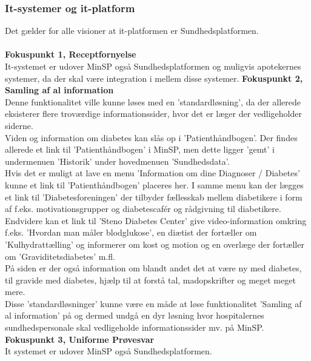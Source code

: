 \subsubsection{It-systemer og it-platform}
Det gælder for alle visioner at it-platformen er Sundhedsplatformen.\\\\
\textbf{Fokuspunkt 1, Receptfornyelse} \\
It-systemet er udover MinSP også Sundhedsplatformen og muligvis apotekernes systemer, da der skal være integration i mellem disse systemer.
\textbf{Fokuspunkt 2, Samling af al information} \\
 Denne funktionalitet ville kunne løses med en 'standardløsning', da der allerede eksisterer flere troværdige informationssider, hvor det er læger der vedligeholder siderne. \\
 Viden og information om diabetes kan slås op i 'Patienthåndbogen'. Der findes allerede et link til 'Patienthåndbogen' i MinSP, men dette ligger 'gemt' i undermenuen 'Historik' under hovedmenuen 'Sundhedsdata'.\\
 Hvis det er muligt at lave en menu 'Information om dine Diagnoser / Diabetes' kunne et link til 'Patienthåndbogen' placeres her. 
 I samme menu kan der lægges et link til 'Diabetesforeningen' der tilbyder fællesskab mellem diabetikere i form af f.eks. motivationsgrupper og diabetescafér og rådgivning til diabetikere.\\
 Endvidere kan et link til 'Steno Diabetes Center' give video-information omkring f.eks. 'Hvordan man måler blodglukose', en diætist der fortæller om 'Kulhydrattælling' og informerer om kost og motion og en overlæge der fortæller om 'Graviditetsdiabetes' m.fl. \\
 På siden er der også information om blandt andet det at være ny med diabetes, til gravide med diabetes, hjælp til at forstå tal, madopskrifter og meget meget mere. \\ 
 Disse 'standardløsninger' kunne være en måde at løse funktionalitet 'Samling af al information' på og dermed undgå en dyr løsning hvor hospitalernes sundhedspersonale skal vedligeholde informationssider mv. på MinSP.
 \\
 \textbf{Fokuspunkt 3, Uniforme Prøvesvar} \\
 It systemet er udover MinSP også Sundhedsplatformen.
